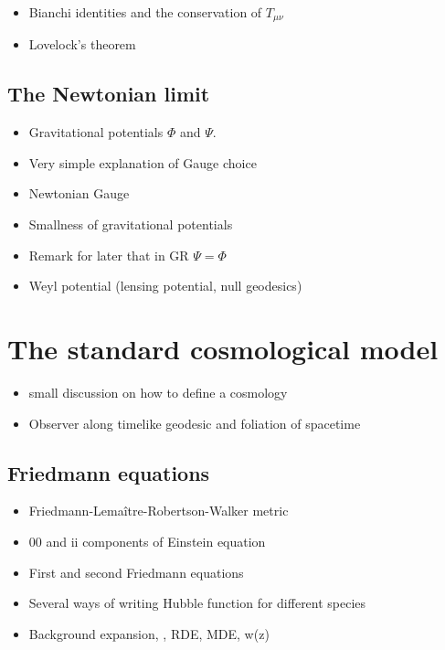 \begin{itemize}
\item Bianchi identities and the conservation of $T_{\mu \nu}$
\item Lovelock's theorem
\end{itemize}

\subsection{The Newtonian limit}

\begin{itemize}
\item Gravitational potentials $\Phi$ and $\Psi$.
\item Very simple explanation of Gauge choice
\item Newtonian Gauge
\item Smallness of gravitational potentials
\item Remark for later that in GR $\Psi=\Phi$
\item Weyl potential (lensing potential, null geodesics)

\end{itemize}


\section{The standard cosmological model}

\begin{itemize}
\item small discussion on how to define a cosmology
\item Observer along timelike geodesic and foliation of spacetime
\end{itemize}

\subsection{Friedmann equations}
 \begin{itemize}
 \item Friedmann-Lemaître-Robertson-Walker metric
 \item 00 and ii components of Einstein equation
 \item First and second Friedmann equations
 \item Several ways of writing Hubble function for different species
 \item Background expansion, , RDE, MDE, w(z)
 \end{itemize}

